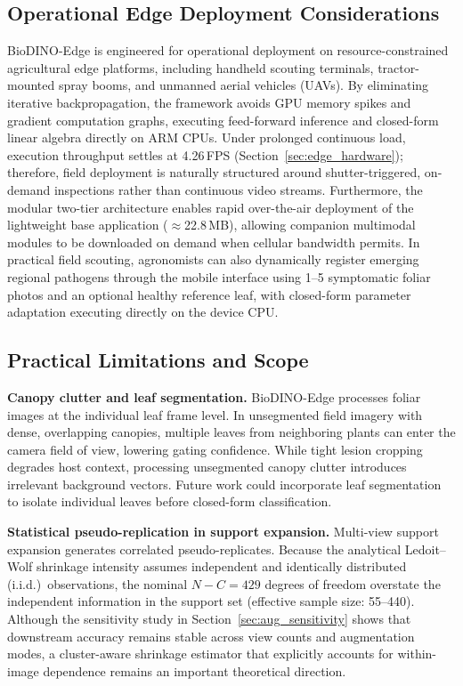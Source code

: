\documentclass[preprint,12pt]{elsarticle}
\begin{document}
\subsection{Operational Edge Deployment Considerations}
BioDINO-Edge is engineered for operational deployment on resource-constrained agricultural edge platforms, including handheld scouting terminals, tractor-mounted spray booms, and unmanned aerial vehicles (UAVs). By eliminating iterative backpropagation, the framework avoids GPU memory spikes and gradient computation graphs, executing feed-forward inference and closed-form linear algebra directly on ARM CPUs. Under prolonged continuous load, execution throughput settles at 4.26\,FPS (Section~\ref{sec:edge_hardware}); therefore, field deployment is naturally structured around shutter-triggered, on-demand inspections rather than continuous video streams. Furthermore, the modular two-tier architecture enables rapid over-the-air deployment of the lightweight base application ($\approx$22.8\,MB), allowing companion multimodal modules to be downloaded on demand when cellular bandwidth permits. In practical field scouting, agronomists can also dynamically register emerging regional pathogens through the mobile interface using 1--5 symptomatic foliar photos and an optional healthy reference leaf, with closed-form parameter adaptation executing directly on the device CPU.

\subsection{Practical Limitations and Scope}
\textbf{Canopy clutter and leaf segmentation.} BioDINO-Edge processes foliar images at the individual leaf frame level. In unsegmented field imagery with dense, overlapping canopies, multiple leaves from neighboring plants can enter the camera field of view, lowering gating confidence. While tight lesion cropping degrades host context, processing unsegmented canopy clutter introduces irrelevant background vectors. Future work could incorporate leaf segmentation to isolate individual leaves before closed-form classification.

\textbf{Statistical pseudo-replication in support expansion.} Multi-view support expansion generates correlated pseudo-replicates. Because the analytical Ledoit--Wolf shrinkage intensity assumes independent and identically distributed (i.i.d.)\ observations, the nominal $N-C=429$ degrees of freedom overstate the independent information in the support set (effective sample size: 55--440). Although the sensitivity study in Section~\ref{sec:aug_sensitivity} shows that downstream accuracy remains stable across view counts and augmentation modes, a cluster-aware shrinkage estimator that explicitly accounts for within-image dependence remains an important theoretical direction.
\end{document}
